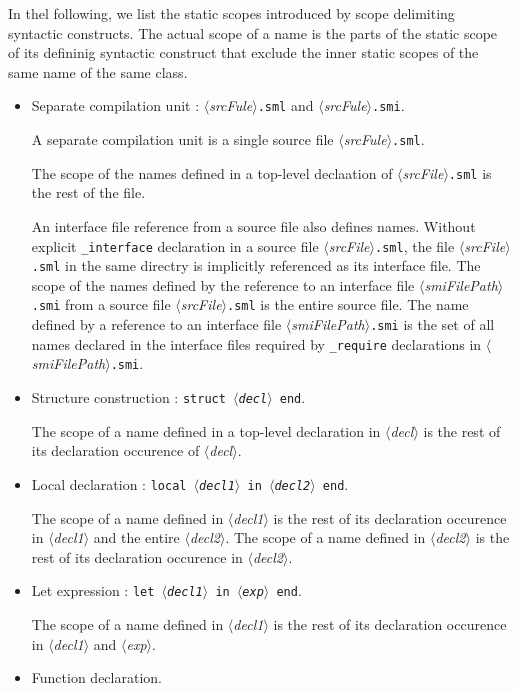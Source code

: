 \documentclass{jbook}
\newcommand{\code}[1]{\mbox{\large\tt #1}}
\newcommand{\nonterm}[1]{\mbox{$\langle$}{\it #1}\mbox{$\rangle$}}
\begin{document}
	In thel following, we list the static scopes introduced by scope
delimiting syntactic constructs.
	The actual scope of a name is the parts of
the static scope of its defininig syntactic construct
that exclude the inner static scopes of the same name of the same class.
\begin{itemize}
\item Separate compilation unit : \nonterm{srcFule}{\tt .sml} and \nonterm{srcFule}{\tt .smi}.

	A separate compilation unit is a single source file 
\nonterm{srcFule}{\tt .sml}.

	The scope of the names defined in a top-level declaation of 
\nonterm{srcFile}{\tt .sml} is the rest of the file.

	An interface file reference from a source file also defines
names.
	Without explicit \code{\_interface} declaration in a source file
\nonterm{srcFile}{\tt .sml}, the file \nonterm{srcFile}{\tt .sml} in the
same directry is implicitly referenced as its interface file.
	The scope of the names defined by the reference to an interface
file \nonterm{smiFilePath}{\tt .smi} from a source file
\nonterm{srcFile}{\tt .sml} is the entire source file.
	The name defined by a reference to an interface
file \nonterm{smiFilePath}{\tt .smi} is the set of all names declared
in the interface files required by \code{\_require} declarations in 
\nonterm{smiFilePath}{\tt .smi}.

\item Structure construction : \code{struct \nonterm{decl} end}.

	The scope of a name defined in a top-level declaration in
\nonterm{decl} is the rest of its declaration occurence of \nonterm{decl}.

\item Local declaration : \code{local \nonterm{decl1} in \nonterm{decl2} end}.

	The scope of a name defined in \nonterm{decl1} is the rest of
its declaration occurence in \nonterm{decl1} and the entire \nonterm{decl2}.
	The scope of a name defined in \nonterm{decl2} is the rest of
its declaration occurence in \nonterm{decl2}.

\item Let expression : \code{let \nonterm{decl1} in \nonterm{exp} end}.

	The scope of a name defined in \nonterm{decl1} is the rest of
its declaration occurence in \nonterm{decl1} and \nonterm{exp}.

\item Function declaration.


\end{itemize}
\end{document}
